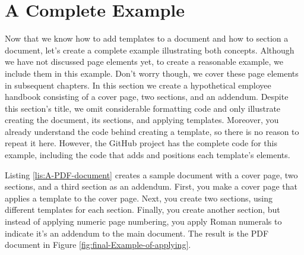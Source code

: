 \documentclass[american,letterpaper]{tufte-book}
\numberwithin{equation}{section}
\numberwithin{figure}{section}
\begin{document}
\section{A Complete Example}

Now that we know how to add templates to a document and how to section
a document, let's create a complete example illustrating both concepts.
Although we have not discussed page elements yet, to create a reasonable
example, we include them in this example. Don't worry though, we cover
these page elements in subsequent chapters. In this section we create
a hypothetical employee handbook consisting of a cover page, two sections,
and an addendum. Despite this section's title, we omit considerable
formatting code and only illustrate creating the document, its sections,
and applying templates. Moreover, you already understand the code behind creating
a template, so there is no reason to repeat it here. However, the
GitHub project has the complete code for this example, including the
code that adds and positions each template's elements. 

Listing \ref{lis:A-PDF-document} creates a sample document with a
cover page, two sections, and a third section as an addendum. First,
you make a cover page that applies a template to the cover page. Next,
you create two sections, using different templates for each section.
Finally, you create another section, but instead of applying numeric
page numbering, you apply Roman numerals to indicate it's an addendum
to the main document. The result is the PDF document in Figure \ref{fig:final-Example-of-applying}.
\end{document}

